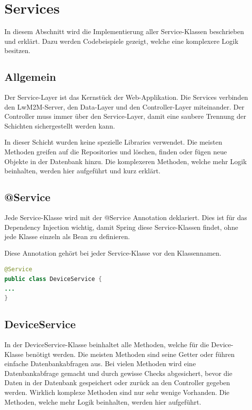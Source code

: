 \newpage

\section{Services}
In diesem Abschnitt wird die Implementierung aller Service-Klassen beschrieben und erklärt. Dazu werden Codebeispiele gezeigt, welche eine komplexere Logik besitzen. 
\subsection{Allgemein}
Der Service-Layer ist das Kernstück der Web-Applikation. Die Services verbinden den LwM2M-Server, den Data-Layer und den Controller-Layer miteinander. Der Controller muss immer über den Service-Layer, damit eine saubere Trennung der Schichten sichergestellt werden kann.

In dieser Schicht wurden keine spezielle Libraries verwendet. Die meisten Methoden greifen auf die Repositories und löschen, finden oder fügen neue Objekte in der Datenbank hinzu. Die komplexeren Methoden, welche mehr Logik beinhalten, werden hier aufgeführt und kurz erklärt. 

\subsection{@Service}
Jede Service-Klasse wird mit der @Service Annotation deklariert. Dies ist für das Dependency Injection wichtig, damit Spring diese Service-Klassen findet, ohne jede Klasse einzeln als Bean zu definieren.

Diese Annotation gehört bei jeder Service-Klasse vor den Klassennamen.
\begin{lstlisting}[language=java]
@Service
public class DeviceService {
...
}
\end{lstlisting}
\subsection{DeviceService}
In der DeviceService-Klasse beinhaltet alle Methoden, welche für die Device-Klasse benötigt werden. Die meisten Methoden sind seine Getter oder führen einfache Datenbankabfragen aus. Bei vielen Methoden wird eine Datenbankabfrage gemacht und durch gewisse Checks abgesichert, bevor die Daten in der Datenbank gespeichert oder zurück an den Controller gegeben werden. Wirklich komplexe Methoden sind nur sehr wenige Vorhanden. Die Methoden, welche mehr Logik beinhalten, werden hier aufgeführt.

